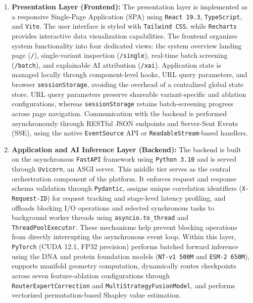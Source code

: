 \begin{enumerate}
    \item \textbf{Presentation Layer (Frontend):}
    The presentation layer is implemented as a responsive Single-Page Application (SPA) using \texttt{React 19.3}, \texttt{TypeScript}, and \texttt{Vite}. The user interface is styled with \texttt{Tailwind CSS}, while \texttt{Recharts} provides interactive data visualization capabilities. The frontend organizes system functionality into four dedicated views: the system overview landing page (\texttt{/}), single-variant inspection (\texttt{/single}), real-time batch screening (\texttt{/batch}), and explainable AI attribution (\texttt{/xai}). Application state is managed locally through component-level hooks, URL query parameters, and browser \texttt{sessionStorage}, avoiding the overhead of a centralized global state store. URL query parameters preserve shareable variant-specific and ablation configurations, whereas \texttt{sessionStorage} retains batch-screening progress across page navigation. Communication with the backend is performed asynchronously through RESTful JSON endpoints and Server-Sent Events (SSE), using the native \texttt{EventSource} API or \texttt{ReadableStream}-based handlers.

    \item \textbf{Application and AI Inference Layer (Backend):}
    The backend is built on the asynchronous \texttt{FastAPI} framework using \texttt{Python 3.10} and is served through \texttt{Uvicorn}, an ASGI server. This middle tier serves as the central orchestration component of the platform. It enforces request and response schema validation through \texttt{Pydantic}, assigns unique correlation identifiers (\texttt{X-Request-ID}) for request tracking and stage-level latency profiling, and offloads blocking I/O operations and selected synchronous tasks to background worker threads using \texttt{asyncio.to\_thread} and \texttt{ThreadPoolExecutor}. These mechanisms help prevent blocking operations from directly interrupting the asynchronous event loop. Within this layer, \texttt{PyTorch} (CUDA 12.1, FP32 precision) performs batched forward inference using the DNA and protein foundation models (\texttt{NT-v1 500M} and \texttt{ESM-2 650M}), supports manifold geometry computation, dynamically routes checkpoints across seven feature-ablation configurations through \texttt{RouterExpertCorrection} and \texttt{MultiStrategyFusionModel}, and performs vectorized permutation-based Shapley value estimation.


\end{enumerate}

